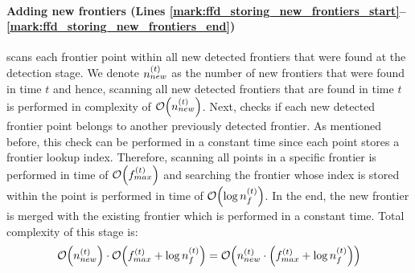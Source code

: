 \paragraph{Adding new frontiers (Lines
\ref{mark:ffd_storing_new_frontiers_start}--\ref{mark:ffd_storing_new_frontiers_end})}
\FFD scans each frontier point within all new detected frontiers that were found
at the detection stage. We denote $n_{new}^{\left(t\right)}$ as the number of new
frontiers that were found in time $t$ and hence, scanning all new detected
frontiers that are found in time $t$ is performed in complexity of
$\mathcal{O}{\left(n_{new}^{\left(t\right)}\right)}$. Next, \FFD checks if each new detected frontier
point belongs to another previously detected frontier. As mentioned before, this
check can be performed in a constant time since each point stores a frontier
lookup index. Therefore, scanning all points in a specific frontier is performed
in time of $\mathcal{O}{\left(f_{max}^{\left(t\right)}\right)}$ and searching the frontier whose index
is stored within the point is performed in time of
$\mathcal{O}{\left(\log{n_f^{\left(t\right)}}\right)}$. In the end, the new frontier is merged with the
existing frontier which is performed in a constant time. Total complexity of
this stage is:
\begin{equation}\label{eq:add_new_frontiers}
	\mathcal{O}{\left(n_{new}^{\left(t\right)}\right)} \cdot
  	\mathcal{O}{\left(f_{max}^{\left(t\right)} + \log{n_f^{\left(t\right)}} \right)} 
  	=
  	\mathcal{O}{\left(n_{new}^{\left(t\right)} \cdot 
  		{\left(f_{max}^{\left(t\right)} + \log{n_f^{\left(t\right)}}\right)}\right)}
\end{equation}

